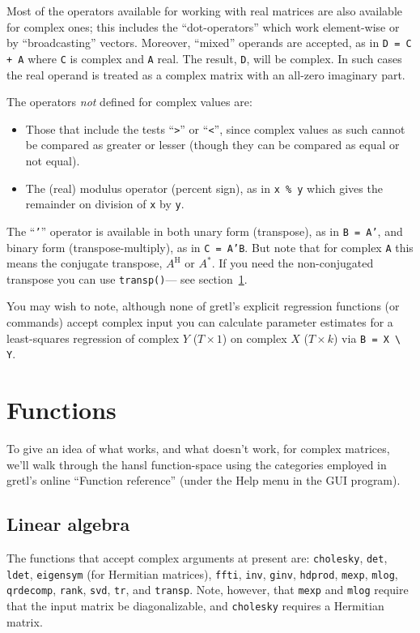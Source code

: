 \documentclass{article}
\begin{document}
Most of the operators available for working with real matrices are
also available for complex ones; this includes the ``dot-operators''
which work element-wise or by ``broadcasting'' vectors. Moreover,
``mixed'' operands are accepted, as in \texttt{D = C + A} where
\texttt{C} is complex and \texttt{A} real. The result, \texttt{D},
will be complex. In such cases the real operand is treated as a
complex matrix with an all-zero imaginary part.

The operators \textit{not} defined for complex values are:
\begin{itemize}
\item Those that include the tests ``\verb+>+'' or ``\verb+<+'', since
  complex values as such cannot be compared as greater or lesser
  (though they can be compared as equal or not equal).
\item The (real) modulus operator (percent sign), as in \texttt{x \%
    y} which gives the remainder on division of \texttt{x} by
  \texttt{y}.
\end{itemize}

The ``\texttt{'}'' operator is available in both unary form
(transpose), as in \texttt{B = A'}, and binary form
(transpose-multiply), as in \texttt{C = A'B}. But note that for
complex \texttt{A} this means the conjugate transpose, $A^\mathrm{H}$ or
$A^*$. If you need the non-conjugated transpose you can use
\texttt{transp()}--- see section~\ref{sec:funcs}.

You may wish to note, although none of gretl's explicit regression
functions (or commands) accept complex input you can calculate
parameter estimates for a least-squares regression of complex $Y$
($T \times 1$) on complex $X$ ($T \times k$) via \verb|B = X \ Y|.

\section{Functions}
\label{sec:funcs}

To give an idea of what works, and what doesn't work, for complex
matrices, we'll walk through the hansl function-space using the
categories employed in gretl's online ``Function reference'' (under the
\textsf{Help} menu in the GUI program).

\subsection{Linear algebra}

The functions that accept complex arguments at present are:
\texttt{cholesky}, \texttt{det}, \texttt{ldet}, \texttt{eigensym} (for
Hermitian matrices), \texttt{ffti}, \texttt{inv}, \texttt{ginv},
\texttt{hdprod}, \texttt{mexp}, \texttt{mlog}, \texttt{qrdecomp},
\texttt{rank}, \texttt{svd}, \texttt{tr}, and \texttt{transp}. Note,
however, that \texttt{mexp} and \texttt{mlog} require that the input
matrix be diagonalizable, and \texttt{cholesky} requires a Hermitian
matrix.
\end{document}
